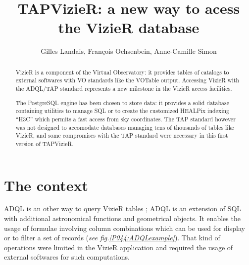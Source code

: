 \documentclass[11pt]{article}
\begin{document}
\title{TAPVizieR: a new way to acess the VizieR database}
\author{
        Gilles Landais, Fran\c cois Ochsenbein, Anne-Camille Simon
}

\begin{abstract}
VizieR is a component of the Virtual Observatory: it provides tables of
catalogs to external softwares with VO standards like the VOTable output.
Accessing VizieR with the ADQL/TAP standard represents a new milestone
in the VizieR access facilities.

The PostgreSQL engine has been chosen to store data: it provides a solid
database containing utilities to manage SQL or to create the customized
HEALPix indexing ``H3C'' which permits a fast access from sky coordinates.
The TAP standard however was not designed to accomodate databases
managing tens of thousands of tables like VizieR, and some compromises
with the TAP standard were necessary in this first version of TAPVizieR.
\end{abstract}



%
\section{The context}

ADQL \citep{adql_2011} is an other way to query VizieR tables 
\citep{ochsenbein_2000}; ADQL is an extension of SQL 
with additional astronomical functions and geometrical objects. 
It enables the usage of formulae involving column combinations which can be used 
for display or to filter a set of records (\textit{see fig.\ref{P044:ADQLexample}}). 
%
That kind of operations were limited in the VizieR application and required 
the usage of external softwares for such computations.
\end{document}
